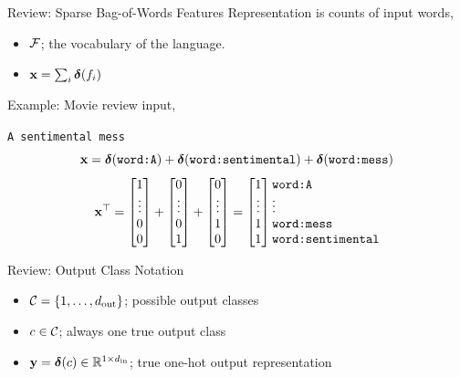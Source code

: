 \documentclass{beamer}
\begin{document}
\begin{frame}{Review: Sparse Bag-of-Words Features}
  Representation is counts of input words, 
  \begin{itemize}
  \item $\mathcal{F}$; the vocabulary of the language.
  \item $\mathbf{x} = \sum_{i} \boldsymbol{\delta}(f_i)$ 
  \end{itemize}

  Example: Movie review input, 
  \begin{center}
    \texttt{A sentimental mess}
    \[ \mathbf{x} = \boldsymbol{\delta}(\texttt{word:A}) + \boldsymbol{\delta}(\texttt{word:sentimental}) +
    \boldsymbol{\delta}(\texttt{word:mess}) \] 
    \[ \boldx^\top =\begin{bmatrix} 1 \\ \vdots
        \\ 0\\ 0 \\ \end{bmatrix} +\begin{bmatrix} 0 \\
        \vdots \\ 0\\ 1 \\ \end{bmatrix} +
     \begin{bmatrix} 0 \\ \vdots \\ 1\\ 0 \\ \end{bmatrix} 
    =\begin{bmatrix} 1 \\ \vdots \\ 1 \\ 1 \\ \end{bmatrix} 
    \begin{matrix*}[l] \mathrm{\texttt{word:A}} \\ \vdots \\ \mathrm{\texttt{word:mess}} \\ \mathrm{\texttt{word:sentimental}} \\ \end{matrix*}
     \]
  \end{center}
\end{frame}



\begin{frame}{Review: Output Class Notation}
  \begin{itemize}
  \item $\mathcal{C} = \{1, \ldots, {d_{\mathrm{out}}}\}$; possible output classes
  \item $c \in \mathcal{C}$; always one true output class 
  \item $\mathbf{y} = \boldsymbol{\delta}(c) \in \mathbb{R}^{1\times {d_{\mathrm{in}}}}$; true one-hot output representation

  \end{itemize}
\end{frame}
\end{document}
